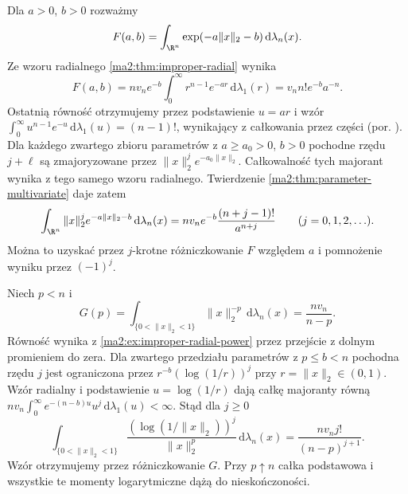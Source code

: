 \begin{przyklad}
\label{ma2:ex:parameter-radial-exponential}
Dla $a>0$, $b>0$ rozważmy
\[
 F(a,b)=\int_{\R^n}
 \exp(-a\|x\|_2-b)\,\mathrm d\lambda_n(x).
\]
Ze wzoru radialnego \ref{ma2:thm:improper-radial}
wynika
\[
 F(a,b)=nv_n e^{-b}\int_0^\infty
 r^{n-1}e^{-ar}\,\mathrm d\lambda_1(r)
 =v_n n! e^{-b}a^{-n}.
\]
Ostatnią równość otrzymujemy przez podstawienie
$u=ar$ i wzór $\int_0^\infty u^{n-1}e^{-u}
\,\mathrm d\lambda_1(u)=(n-1)!$,
wynikający z całkowania przez części (por.
).
Dla każdego zwartego zbioru parametrów
z $a\ge a_0>0$, $b>0$ pochodne rzędu $j+\ell$
są zmajoryzowane przez $\|x\|_2^j e^{-a_0\|x\|_2}$.
Całkowalność tych majorant wynika z tego samego
wzoru radialnego.
Twierdzenie \ref{ma2:thm:parameter-multivariate}
daje zatem
\[
 \int_{\R^n}\|x\|_2^j e^{-a\|x\|_2-b}
 \,\mathrm d\lambda_n(x)
 =nv_n e^{-b}\frac{(n+j-1)!}{a^{n+j}}
 \qquad(j=0,1,2,\ldots).
\]
Można to uzyskać przez $j$-krotne różniczkowanie
$F$ względem $a$ i pomnożenie wyniku przez $(-1)^j$.
\end{przyklad}

\begin{przyklad}
\label{ma2:ex:parameter-singularity}
Niech $p<n$ i
\[
 G(p)=\int_{\{0<\|x\|_2<1\}}\|x\|_2^{-p}
 \,\mathrm d\lambda_n(x)=\frac{nv_n}{n-p}.
\]
Równość wynika z \ref{ma2:ex:improper-radial-power}
przez przejście z dolnym promieniem do zera.
Dla zwartego przedziału parametrów z $p\le b<n$
pochodna rzędu $j$ jest ograniczona przez
$r^{-b}(\log(1/r))^j$ przy $r=\|x\|_2\in(0,1)$.
Wzór radialny i podstawienie $u=\log(1/r)$ dają
całkę majoranty równą
$nv_n\int_0^\infty e^{-(n-b)u}u^j
\,\mathrm d\lambda_1(u)<\infty$.
Stąd dla $j\ge0$
\[
 \int_{\{0<\|x\|_2<1\}}
 \frac{(\log(1/\|x\|_2))^j}{\|x\|_2^p}
 \,\mathrm d\lambda_n(x)
 =\frac{nv_n j!}{(n-p)^{j+1}}.
\]
Wzór otrzymujemy przez różniczkowanie $G$.
Przy $p\uparrow n$ całka podstawowa i wszystkie
te momenty logarytmiczne dążą do nieskończoności.
\end{przyklad}

